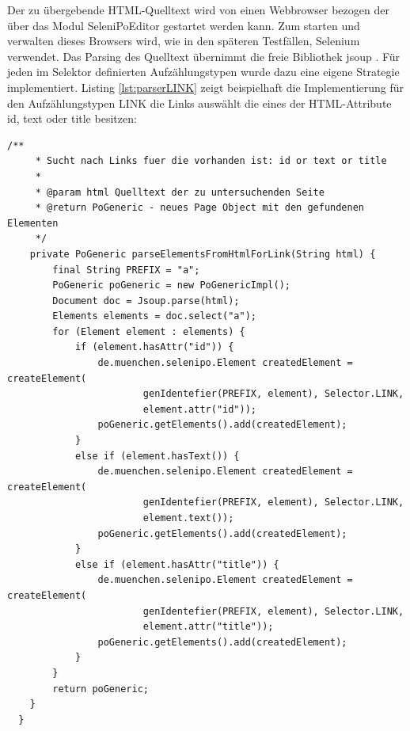 Der zu übergebende HTML-Quelltext wird von einen Webbrowser bezogen der über das Modul SeleniPoEditor gestartet werden kann. Zum starten und verwalten dieses Browsers wird, wie in den späteren Testfällen, Selenium verwendet.
Das Parsing des Quelltext übernimmt die freie Bibliothek jsoup \cite{hedley_jsoup_2015}.
Für jeden im Selektor definierten Aufzählungstypen wurde dazu eine eigene Strategie implementiert.
Listing \ref{lst:parserLINK} zeigt beispielhaft die Implementierung für den Aufzählungstypen LINK die Links auswählt die eines der HTML-Attribute id, text oder title besitzen:
\begin{lstlisting}[caption={Parser für den Aufzählungstypen LINK},label={lst:parserLINK}]
 	/**
	 * Sucht nach Links fuer die vorhanden ist: id or text or title
	 *
	 * @param html Quelltext der zu untersuchenden Seite
	 * @return PoGeneric - neues Page Object mit den gefundenen Elementen
	 */
	private PoGeneric parseElementsFromHtmlForLink(String html) {
		final String PREFIX = "a";
		PoGeneric poGeneric = new PoGenericImpl();
		Document doc = Jsoup.parse(html);
		Elements elements = doc.select("a");
		for (Element element : elements) {
			if (element.hasAttr("id")) {
				de.muenchen.selenipo.Element createdElement = createElement(
						genIdentefier(PREFIX, element), Selector.LINK,
						element.attr("id"));
				poGeneric.getElements().add(createdElement);
			}
			else if (element.hasText()) {
				de.muenchen.selenipo.Element createdElement = createElement(
						genIdentefier(PREFIX, element), Selector.LINK,
						element.text());
				poGeneric.getElements().add(createdElement);
			}
			else if (element.hasAttr("title")) {
				de.muenchen.selenipo.Element createdElement = createElement(
						genIdentefier(PREFIX, element), Selector.LINK,
						element.attr("title"));
				poGeneric.getElements().add(createdElement);
			}
		}
		return poGeneric;
	}
  }
  
\end{lstlisting} 

